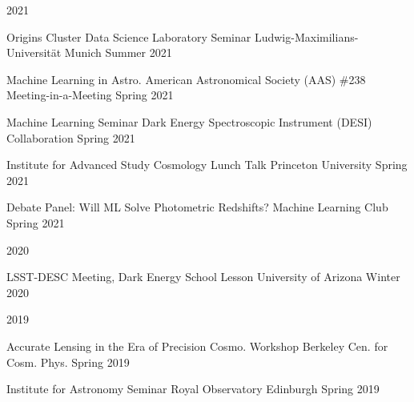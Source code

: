 \documentclass[11pt,letterpaper]{article}
\begin{document}
\begin{list}{}{\malzlist}
\begin{list}{}{\malzlist}
	\end{list}
		\item 2021
		\nopagebreak\begin{list}{}{\malzlist}
			\item {}
			{Origins Cluster Data Science Laboratory Seminar}
			{Ludwig-Maximilians-Universit{\"a}t Munich}%
		{Summer 2021}
		\item {}
		{Machine Learning in Astro.}%
	{American Astronomical Society (AAS) \#238 Meeting-in-a-Meeting}
	{Spring 2021}
	\item {}
	{Machine Learning Seminar}
	{Dark Energy Spectroscopic Instrument (DESI) Collaboration}
	{Spring 2021}
	\item {}
	{Institute for Advanced Study Cosmology Lunch Talk}
	{Princeton University}
	{Spring 2021}
	\item {}
	{Debate Panel: Will ML Solve Photometric Redshifts?}
	{Machine Learning Club}
	{Spring 2021}
\end{list}
\item 2020
\nopagebreak\begin{list}{}{\malzlist}
	\item {}
	{LSST-DESC Meeting, Dark Energy School Lesson}
	{University of Arizona}
	{Winter 2020}
\end{list}
\item 2019
\nopagebreak\begin{list}{}{\malzlist}
	\item {}
	{Accurate Lensing in the Era of Precision Cosmo. Workshop}
	{Berkeley Cen. for Cosm. Phys.}
	{Spring 2019}
	\item {}
	{Institute for Astronomy Seminar}
	{Royal Observatory Edinburgh}
	{Spring 2019}
	\item {}

\end{list}
\end{list}
\end{document}
